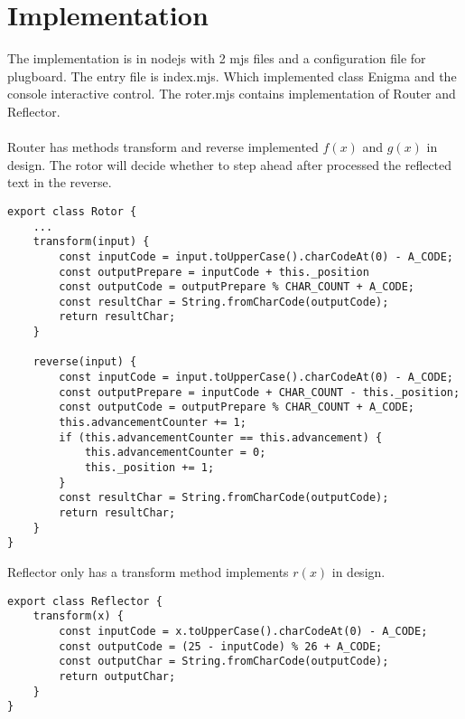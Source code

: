 \documentclass[11pt,a4paper]{article}
\begin{document}
\section{Implementation}
The implementation is in nodejs with 2 mjs files and a configuration file for plugboard.
The entry file is index.mjs. Which implemented class Enigma and the console interactive control.
The roter.mjs contains implementation of Router and Reflector.\\\\
Router has methods transform and reverse implemented $f(x)$ and $g(x)$ in design. The rotor will decide whether to step ahead after processed the reflected text in the reverse.
\begin{lstlisting}
export class Rotor {
    ...
    transform(input) {
        const inputCode = input.toUpperCase().charCodeAt(0) - A_CODE;
        const outputPrepare = inputCode + this._position
        const outputCode = outputPrepare % CHAR_COUNT + A_CODE;
        const resultChar = String.fromCharCode(outputCode);
        return resultChar;
    }

    reverse(input) {
        const inputCode = input.toUpperCase().charCodeAt(0) - A_CODE;
        const outputPrepare = inputCode + CHAR_COUNT - this._position;
        const outputCode = outputPrepare % CHAR_COUNT + A_CODE;
        this.advancementCounter += 1;
        if (this.advancementCounter == this.advancement) {
            this.advancementCounter = 0;
            this._position += 1;
        }
        const resultChar = String.fromCharCode(outputCode);
        return resultChar;
    }
}
\end{lstlisting}
Reflector only has a transform method implements $r(x)$ in design.
\begin{lstlisting}
export class Reflector {
    transform(x) {
        const inputCode = x.toUpperCase().charCodeAt(0) - A_CODE;
        const outputCode = (25 - inputCode) % 26 + A_CODE;
        const outputChar = String.fromCharCode(outputCode);
        return outputChar;
    }
}
\end{lstlisting}
\end{document}
